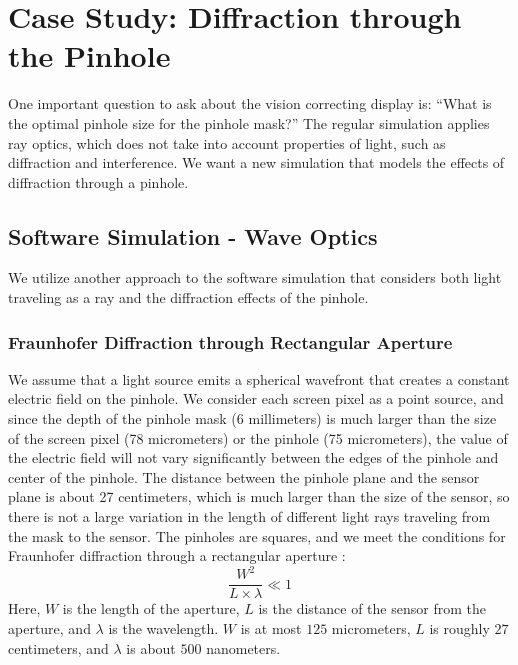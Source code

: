 \chapter{Case Study: Diffraction through the Pinhole}


One important question to ask about the vision correcting display is: ``What is the optimal pinhole size for the pinhole mask?'' The regular simulation applies ray optics, which does not take into account properties of light, such as diffraction and interference. We want a new simulation that models the effects of diffraction through a pinhole.

\section{Software Simulation - Wave Optics}

We utilize another approach to the software simulation that considers both light traveling as a ray and the diffraction effects of the pinhole. 

\subsection{Fraunhofer Diffraction through Rectangular Aperture}
\noindent We assume that a light source emits a spherical wavefront that creates a constant electric field on the pinhole. We consider each screen pixel as a point source, and since the depth of the pinhole mask (6 millimeters) is much larger than the size of the screen pixel (78 micrometers) or the pinhole (75 micrometers), the value of the electric field will not vary significantly between the edges of the pinhole and center of the pinhole. The distance between the pinhole plane and the sensor plane is about 27 centimeters, which is much larger than the size of the sensor, so there is not a large variation in the length of different light rays traveling from the mask to the sensor. The pinholes are squares, and we meet the conditions for Fraunhofer diffraction through a rectangular aperture \cite{Lipson:1987:OpticalPhysics}: 
$$\frac{W^2}{L \times \lambda} \ll 1$$
Here, $W$ is the length of the aperture, $L$ is the distance of the sensor from the aperture, and $\lambda$ is the wavelength. $W$ is at most $125$ micrometers, $L$ is roughly $27$ centimeters, and $\lambda$ is about $500$ nanometers. 

